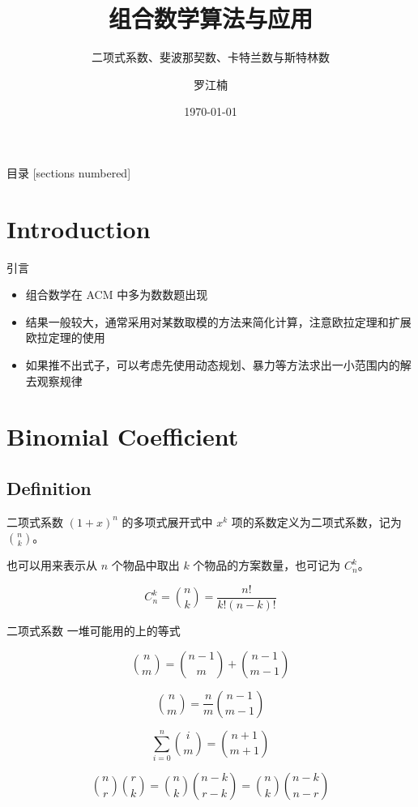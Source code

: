 \documentclass[12pt,aspectratio=169]{beamer}
\title{组合数学算法与应用}
\subtitle{二项式系数、斐波那契数、卡特兰数与斯特林数}
\date{\today}
\author{罗江楠}
\institute{哈尔滨工业大学（威海）}
\begin{document}
\maketitle

\begin{frame}{目录}
  [sections numbered]
  \tableofcontents[hideallsubsections]
\end{frame}

\section[引言]{Introduction}

\begin{frame}[fragile]{引言}
  \begin{itemize}
    \item 组合数学在 ACM 中多为数数题出现
    \item 结果一般较大，通常采用对某数取模的方法来简化计算，注意欧拉定理和扩展欧拉定理的使用
    \item 如果推不出式子，可以考虑先使用动态规划、暴力等方法求出一小范围内的解去观察规律
  \end{itemize}
\end{frame}

\section[二项式系数]{Binomial Coefficient}

\subsection[二项式系数]{Definition}

\begin{frame}[fragile]{二项式系数}
$(1+x)^n$ 的多项式展开式中 $x^k$ 项的系数定义为二项式系数，记为 ${n \choose k}$。

也可以用来表示从 $n$ 个物品中取出 $k$ 个物品的方案数量，也可记为 $C_n^k$。

$$
C_n^k = {n \choose k} = \frac{n!}{k!(n-k)!}
$$
\end{frame}

\begin{frame}[fragile]{二项式系数}
一堆可能用的上的等式

$$
{n \choose m} = {n-1 \choose m} + {n-1 \choose m-1}
$$

$$
{n \choose m} = \frac{n}{m} {n-1 \choose m-1}
$$

$$
\sum_{i=0}^{n} {i \choose m} = {n+1 \choose m+1}
$$

$$
{n \choose r}{r \choose k} = {n \choose k} {n-k \choose r-k} = {n \choose k} {n-k \choose n-r}
$$
\end{frame}
\end{document}
